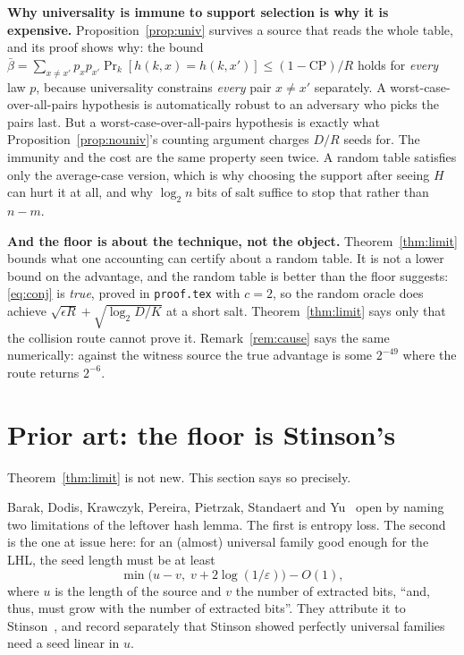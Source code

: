\documentclass{aicr-solution}
\newcommand{\CP}{\mathrm{CP}}
\begin{document}
\medskip
\noindent\textbf{Why universality is immune to support selection is why it is expensive.}
Proposition~\ref{prop:univ} survives a source that reads the whole table, and its proof shows why:
the bound
$\bar\beta = \sum_{x \ne x'} p_x p_{x'}\Pr_k[h(k,x) = h(k,x')] \le (1-\CP)/R$ holds for
\emph{every} law $p$, because universality constrains \emph{every} pair $x \ne x'$ separately. A
worst-case-over-all-pairs hypothesis is automatically robust to an adversary who picks the pairs
last. But a worst-case-over-all-pairs hypothesis is exactly what Proposition~\ref{prop:nouniv}'s counting
argument charges $D/R$ seeds for. The immunity and the cost are the same property seen twice. A
random table satisfies only the average-case version, which is why choosing the support after
seeing $H$ can hurt it at all, and why $\log_2 n$ bits of salt suffice to stop that rather than
$n - m$.

\medskip
\noindent\textbf{And the floor is about the technique, not the object.} Theorem~\ref{thm:limit}
bounds what one accounting can certify about a random table. It is not a lower bound on the
advantage, and the random table is better than the floor suggests: \eqref{eq:conj} is
\emph{true}, proved in \texttt{proof.tex} with $c = 2$, so the random oracle does achieve
$\sqrt{\epsilon R} + \sqrt{\log_2 D/K}$ at a short salt. Theorem~\ref{thm:limit} says only that the
collision route cannot prove it. Remark~\ref{rem:cause} says the same numerically: against the
witness source the true advantage is some $2^{-49}$ where the route returns $2^{-6}$.



\section{Prior art: the floor is Stinson's}\label{sec:prior}

Theorem~\ref{thm:limit} is not new. This section says so precisely.

Barak, Dodis, Krawczyk, Pereira, Pietrzak, Standaert and Yu~\cite{BDKPPSY11} open by naming two
limitations of the leftover hash lemma. The first is entropy loss. The second is the one at issue
here: for an (almost) universal family good enough for the LHL, the seed length must be at least
\[
  \min\bigl(u - v,\; v + 2\log(1/\varepsilon)\bigr) - O(1) ,
\]
where $u$ is the length of the source and $v$ the number of extracted bits, ``and, thus, must grow
with the number of extracted bits''. They attribute it to Stinson~\cite{Sti94}, and record
separately that Stinson showed perfectly universal families need a seed linear in $u$.
\end{document}
